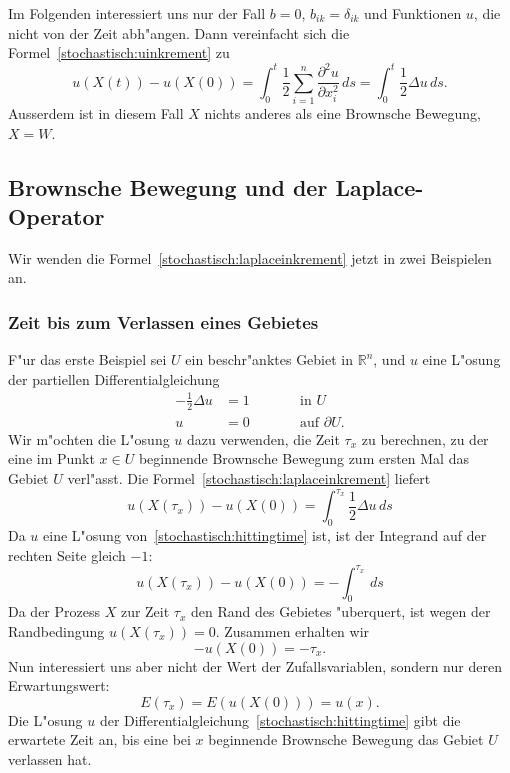 Im Folgenden interessiert uns nur der Fall $b=0$, $b_{ik}=\delta_{ik}$
und Funktionen $u$, die nicht von der Zeit abh"angen.
Dann vereinfacht sich die Formel~\eqref{stochastisch:uinkrement} zu
\begin{equation}
u(X(t))-u(X(0))
=
\int_0^t \frac12\sum_{i=1}^n\frac{\partial^2 u}{\partial x_i^2}\,ds
=
\int_0^t \frac12\Delta u\,ds.
\label{stochastisch:laplaceinkrement}
\end{equation}
Ausserdem ist in diesem Fall $X$ nichts anderes als eine Brownsche Bewegung,
$X=W$.

\subsection{Brownsche Bewegung und der Laplace-Operator}
Wir wenden die Formel~\ref{stochastisch:laplaceinkrement} jetzt in
zwei Beispielen an.

\subsubsection{Zeit bis zum Verlassen eines Gebietes}
F"ur das erste Beispiel sei $U$ ein beschr"anktes Gebiet in
$\mathbb R^n$, und $u$ eine L"osung der partiellen Differentialgleichung
\begin{equation}
\begin{aligned}
-\frac12\Delta u&=1&\qquad&\text{in $U$}\\
               u&=0&      &\text{auf $\partial U$.}
\end{aligned}
\label{stochastisch:hittingtime}
\end{equation}
Wir m"ochten die L"osung $u$ dazu verwenden, die Zeit $\tau_x$ zu berechnen,
zu der eine im Punkt $x\in U$ beginnende Brownsche Bewegung zum ersten
Mal das Gebiet $U$ verl"asst.
Die Formel~\eqref{stochastisch:laplaceinkrement} liefert
\[
u(X(\tau_x))-u(X(0)) = \int_0^{\tau_x} \frac12\Delta u\,ds
\]
Da $u$ eine L"osung von~\eqref{stochastisch:hittingtime} ist, ist der 
Integrand auf der rechten Seite gleich $-1$:
\[
u(X(\tau_x))-u(X(0)) = -\int_0^{\tau_x} \,ds
\]
Da der Prozess $X$ zur Zeit $\tau_x$ den Rand des Gebietes "uberquert,
ist wegen der Randbedingung $u(X(\tau_x))=0$. 
Zusammen erhalten wir
\[
-u(X(0)) = -\tau_x.
\]
Nun interessiert uns aber nicht der Wert der Zufallsvariablen, sondern
nur deren Erwartungswert:
\[
E(\tau_x)=E(u(X(0)))=u(x).
\]
Die L"osung $u$ der Differentialgleichung~\eqref{stochastisch:hittingtime}
gibt die erwartete Zeit an, bis eine bei $x$ beginnende Brownsche Bewegung 
das Gebiet $U$ verlassen hat.

